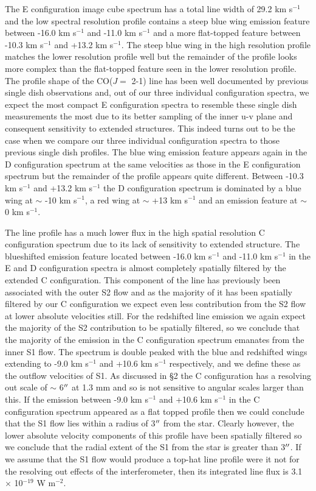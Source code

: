 \documentclass[iop]{emulateapj}
\begin{document}
The E configuration image cube spectrum has a total line width of 29.2 km s${}^{-1}$ and the low spectral resolution profile contains a steep blue wing emission feature between -16.0 km s${}^{-1}$ and -11.0 km s${}^{-1}$ and a more flat-topped feature between -10.3 km s${}^{-1}$ and +13.2 km s${}^{-1}$. The steep blue wing in the high resolution profile matches the lower resolution profile well but the  remainder of the profile looks more complex than the flat-topped feature seen in the lower resolution profile. The profile shape of the CO($J=$ 2-1) line has been well documented by previous single dish observations \citep[e.g.][]{1980ApJ...242L..25K, 1987ApJ...313..400H} and, out of our three individual configuration spectra, we expect the most compact E configuration spectra to resemble these single dish measurements the most due to its better sampling of the inner u-v plane and consequent sensitivity to extended structures. This indeed turns out to be the case when we compare our three individual configuration spectra to those previous single dish profiles. The blue wing emission feature appears again in the D configuration spectrum at the same velocities as those in the E configuration spectrum but the remainder of the profile appears quite different. Between -10.3 km s${}^{-1}$ and +13.2 km s${}^{-1}$ the D configuration spectrum is dominated by a blue wing at $\sim$ -10 km s${}^{-1}$, a red wing at $\sim$ +13 km s${}^{-1}$ and an emission feature at $\sim$ 0 km s${}^{-1}$. 

The line profile has a much lower flux in the high spatial resolution C configuration spectrum due to its lack of sensitivity to extended structure. The blueshifted emission feature located between -16.0 km s${}^{-1}$ and -11.0 km s${}^{-1}$ in the E and D configuration spectra is almost completely spatially filtered by the extended C configuration. This component of the line has previously been associated with the outer S2 flow \citep{1987ApJ...313..400H} and as the majority of it has been spatially filtered by our C configuration we expect even less contribution from the S2 flow at lower absolute velocities still. For the redshifted line emission we again expect the majority of the S2 contribution to be spatially filtered, so we conclude that the majority of the emission in the C configuration spectrum emanates from the inner S1 flow. The spectrum is double peaked with the blue and redshifted wings extending to -9.0 km s${}^{-1}$ and +10.6 km s${}^{-1}$ respectively, and we define these as the outflow velocities of S1. As discussed in \S2 the C configuration has a resolving out scale of $\sim$ 6$\mbox{$^{\prime\prime}$}$ at 1.3 mm and so is not sensitive to angular scales larger than this. If the emission between -9.0 km s${}^{-1}$ and +10.6 km s${}^{-1}$ in the C configuration spectrum appeared as a flat topped profile then we could conclude that the S1 flow lies within a radius of 3$\mbox{$^{\prime\prime}$}$ from the star. Clearly however, the lower absolute velocity components of this profile have been spatially filtered so we conclude that the radial extent of the S1 from the star is greater than 3$\mbox{$^{\prime\prime}$}$. If we assume that the S1 flow would produce a top-hat line profile were it not for the resolving out effects of the interferometer, then its integrated line flux is 3.1 $\times$ 10${}^{-19}$ W m${}^{-2}$.
\end{document}
